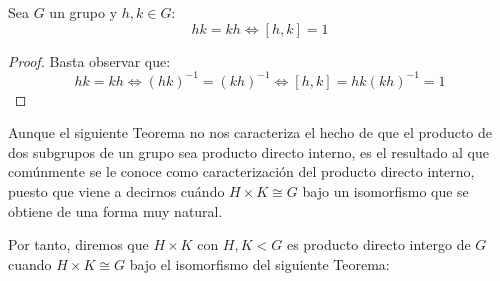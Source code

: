 \begin{prop}\label{prop:primer_conmutador}
    Sea $G$ un grupo y $h,k\in G$:
    \begin{equation*}
        hk = kh \Longleftrightarrow [h,k] = 1
    \end{equation*}
    \begin{proof}
        Basta observar que:
        \begin{equation*}
            hk = kh \Longleftrightarrow {(hk)}^{-1} = {(kh)}^{-1} \Longleftrightarrow [h,k] = hk{(kh)}^{-1} = 1
        \end{equation*}\qedhere
    \end{proof}
\end{prop}

\noindent
Aunque el siguiente Teorema no nos caracteriza el hecho de que el producto de dos subgrupos de un grupo sea producto directo interno, es el resultado al que comúnmente se le conoce como caracterización del producto directo interno, puesto que viene a decirnos cuándo $H\times K \cong G$ bajo un isomorfismo que se obtiene de una forma muy natural.

Por tanto, diremos que $H\times K$ con $H,K<G$ es producto directo intergo de $G$ cuando $H\times K\cong G$ bajo el isomorfismo del siguiente Teorema:

